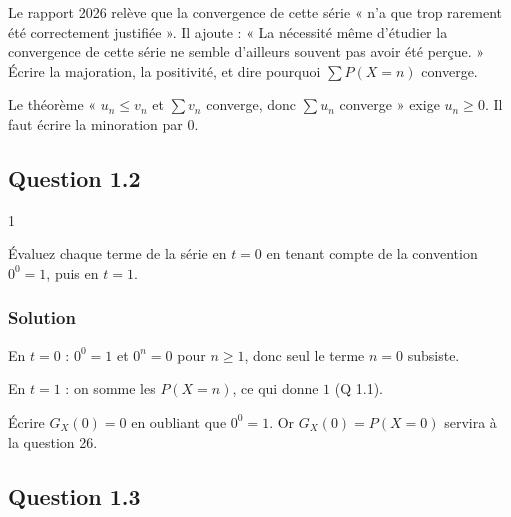 \documentclass[11pt,a4paper]{article}
\newcommand{\equationajustee}[1]{%
  \sbox{\boiteequation}{$\displaystyle #1$}%
  \ifdim\wd\boiteequation>\linewidth
    \[\resizebox{\linewidth}{!}{\usebox{\boiteequation}}\]%
  \else
    \[#1\]%
  \fi}
\begin{document}
\begin{jury}

Le rapport 2026 relève que la convergence de cette série « n'a que trop rarement été correctement justifiée ». Il ajoute : « La nécessité même d'étudier la convergence de cette série ne semble d'ailleurs souvent pas avoir été perçue. » Écrire la majoration, la positivité, et dire pourquoi \(\sum P(X=n)\) converge.

\end{jury}

\begin{piege}

Le théorème « \(u_n\le v_n\) et \(\sum v_n\) converge, donc \(\sum u_n\) converge » exige \(u_n\ge0\). Il faut écrire la minoration par \(0\).

\end{piege}

\hypertarget{question-1.2}{%
\subsection{Question 1.2}\label{question-1.2}}

\begin{indication}{1}

Évaluez chaque terme de la série en \(t=0\) en tenant compte de la convention \(0^0=1\), puis en \(t=1\).

\end{indication}

\hypertarget{solution-1}{%
\subsubsection{Solution}\label{solution-1}}

En \(t=0\) : \(0^0=1\) et \(0^n=0\) pour \(n\ge1\), donc seul le terme \(n=0\) subsiste.

En \(t=1\) : on somme les \(P(X=n)\), ce qui donne \(1\) (Q 1.1).

\equationajustee{\boxed{G_X(0)=P(X=0)}}

\equationajustee{\boxed{G_X(1)=1}}

\begin{piege}

Écrire \(G_X(0)=0\) en oubliant que \(0^0=1\). Or \(G_X(0)=P(X=0)\) servira à la question 26.

\end{piege}

\hypertarget{question-1.3}{%
\subsection{Question 1.3}\label{question-1.3}}
\end{document}
